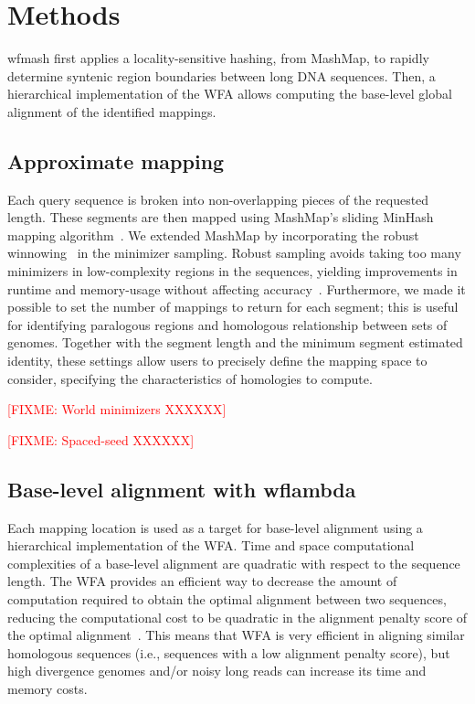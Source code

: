 \documentclass{bioinfo}
\theoremstyle{definition}
\newcommand{\red}[1]{{\textcolor{Red}{#1}}}
\newcommand{\FIXME}[1]{\red{[FIXME: #1]}}
\begin{document}
%




\section{Methods}
\label{sec:methods}

wfmash first applies a locality-sensitive hashing, from MashMap, to rapidly determine syntenic region boundaries between long DNA sequences.
Then, a hierarchical implementation of the WFA allows computing the base-level global alignment of the identified mappings.

\subsection{Approximate mapping}
Each query sequence is broken into non-overlapping pieces of the requested length.
These segments are then mapped using MashMap's sliding MinHash mapping algorithm~\citep{Jain_2018}.
We extended MashMap by incorporating the robust winnowing~\citep{Schleimer2003} in the minimizer sampling.
Robust sampling avoids taking too many minimizers in low-complexity regions in the sequences, yielding improvements in runtime and memory-usage without affecting accuracy~\citep{Jain_2020}.
Furthermore, we made it possible to set the number of mappings to return for each segment; this is useful for identifying paralogous regions and homologous relationship between sets of genomes.
Together with the segment length and the minimum segment estimated identity, these settings allow users to precisely define the mapping space to consider, specifying the characteristics of homologies to compute.

\FIXME{World minimizers XXXXXX}

\FIXME{Spaced-seed XXXXXX}


\subsection{Base-level alignment with wflambda}
Each mapping location is used as a target for base-level alignment using a hierarchical implementation of the WFA.
Time and space computational complexities of a base-level alignment are quadratic with respect to the sequence length.
The WFA provides an efficient way to decrease the amount of computation required to obtain the optimal alignment between two sequences, reducing the computational cost to be quadratic in the alignment penalty score of the optimal alignment~\citep{Marco_Sola_2020}.
This means that WFA is very efficient in aligning similar homologous sequences (i.e., sequences with a low alignment penalty score), but high divergence genomes and/or noisy long reads can increase its time and memory costs.
\end{document}
